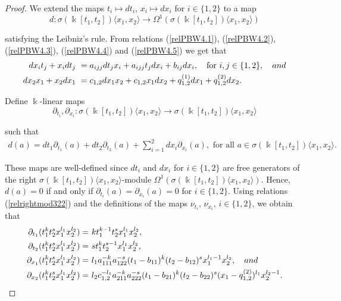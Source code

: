 \documentclass{amsart}
\theoremstyle{definition}
\theoremstyle{remark}
\numberwithin{equation}{section}
\begin{document}
\begin{proof}
We extend the maps $t_i\mapsto dt_i$, $x_i\mapsto dx_i$ for $i \in \{1, 2\}$ to a map 
$$
d: \sigma(\Bbbk[t_1, t_2])\langle x_1, x_2\rangle \to \Omega^{1}(\sigma(\Bbbk[t_1, t_2])\langle x_1, x_2\rangle)
$$ 

satisfying the Leibniz's rule. From relations {\rm (}\ref{relPBW4.1}{\rm )}, {\rm (}\ref{relPBW4.2}{\rm )}, {\rm (}\ref{relPBW4.3}{\rm )}, {\rm (}\ref{relPBW4.4}{\rm )} and {\rm (}\ref{relPBW4.5}{\rm )} we get that
    \begin{align*}
        dx_it_j+x_idt_j &\ = a_{ijj}dt_jx_i+a_{ijj}t_jdx_i+b_{ij}dx_i, \quad \text{for}\ i,j \in \{1, 2\}, \quad {\rm and} \\
        dx_2x_1+x_2dx_1 &\ = c_{1,2}dx_1x_2+c_{1,2}x_1dx_2 +q_{1,2}^{(1)}dx_1+q_{1,2}^{(2)}dx_2.
    \end{align*}
    
Define $\Bbbk$-linear maps $$
\partial_{t_i}, \partial_{x_i}: \sigma(\Bbbk[t_1, t_2])\langle x_1, x_2\rangle \rightarrow \sigma(\Bbbk[t_1, t_2])\langle x_1, x_2\rangle
$$ 

such that
\begin{align*}
d(a)=dt_1\partial_{t_1}(a)+dt_2\partial_{t_2}(a)+\sum_{i=1}^{2}dx_i\partial_{x_i}(a), \text{ for all } a \in \sigma(\Bbbk[t_1, t_2])\langle x_1, x_2\rangle.
\end{align*}

These maps are well-defined since $dt_i$ and $dx_i$ for $i \in \{1, 2\}$ are free generators of the right $\sigma(\Bbbk[t_1, t_2])\langle x_1, x_2\rangle$-module $\Omega^1(\sigma(\Bbbk[t_1, t_2])\langle x_1, x_2\rangle)$. Hence, $d(a)=0$ if and only if $\partial_{t_i}(a)=\partial_{x_i}(a)=0$ for $i \in \{1, 2\}$. Using relations {\rm (}\ref{relrightmod322}{\rm )} and the definitions of the maps $\nu_{t_i}$, $\nu_{x_i}$, $i \in \{1, 2\}$, we obtain that
\begin{align}
\partial_{t_1}(t_1^kt_2^{s}x_1^{l_1}x_2^{l_2}) = &\ kt_1^{k-1}t_2^{s}x_1^{l_1}x_2^{l_2}, \\
\partial_{t_2}(t_1^kt_2^{s}x_1^{l_1}x_2^{l_2}) = &\ st_1^kt_2^{s-1}x_1^{l_1}x_2^{l_2}, \notag \\
\partial_{x_1}(t_1^kt_2^{s}x_1^{l_1}x_2^{l_2}) = &\ l_1a_{111}^{-k}a_{122}^{-s}(t_1-b_{11})^k(t_2-b_{12})^sx_1^{l_1-1}x_2^{l_2}, \quad {\rm and} \notag \\
\partial_{x_2}(t_1^kt_2^{s}x_1^{l_1}x_2^{l_2}) = &\ l_2c_{1,2}^{-l_1}a_{211}^{-k}a_{222}^{-s}(t_1-b_{21})^k(t_2-b_{22})^s(x_1-q_{1,2}^{(2)})^{l_1}x_2^{l_2-1}. \notag
\end{align}


\end{proof}
\end{document}
